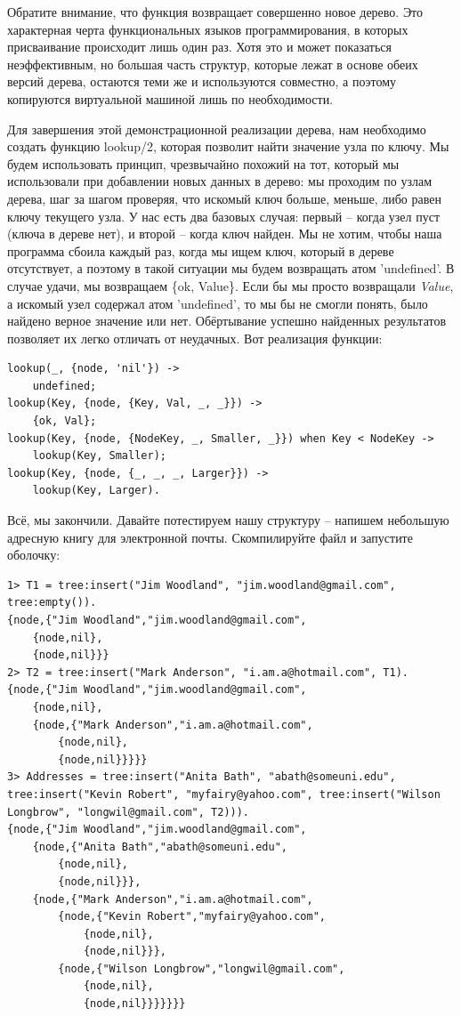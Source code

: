 \documentclass[a4paper,12pt]{report}
\newcommand{\ops}{\colorbox{lgreen}}
\begin{document}
Обратите внимание, что функция возвращает совершенно новое дерево. Это характерная черта функциональных языков программирования, в которых присваивание происходит лишь один раз. Хотя это и может показаться неэффективным, но большая часть структур, которые лежат в основе обеих версий дерева, остаются теми же и используются совместно, а поэтому копируются виртуальной машиной лишь по необходимости.

Для завершения этой демонстрационной реализации дерева, нам необходимо создать функцию \ops{lookup/2}, которая позволит найти значение узла по ключу. Мы будем использовать принцип, чрезвычайно похожий на тот, который мы использовали при добавлении новых данных в дерево: мы проходим по узлам дерева, шаг за шагом проверяя, что искомый ключ больше, меньше, либо равен ключу текущего узла. У нас есть два базовых случая: первый \--- когда узел пуст (ключа в дереве нет), и второй \--- когда ключ найден. Мы не хотим, чтобы наша программа сбоила каждый раз, когда мы ищем ключ, который в дереве отсутствует, а поэтому в такой ситуации мы будем возвращать атом 'undefined'. В случае удачи, мы возвращаем \ops{\{ok, Value\}}. Если бы мы просто возвращали \emph{Value}, а искомый узел содержал атом 'undefined', то мы бы не смогли понять, было найдено верное значение или нет. Обёртывание успешно найденных результатов позволяет их легко отличать от неудачных. Вот реализация функции:
\begin{lstlisting}[style=erlang]
lookup(_, {node, 'nil'}) ->
    undefined;
lookup(Key, {node, {Key, Val, _, _}}) ->
    {ok, Val};
lookup(Key, {node, {NodeKey, _, Smaller, _}}) when Key < NodeKey ->
    lookup(Key, Smaller);
lookup(Key, {node, {_, _, _, Larger}}) ->
    lookup(Key, Larger).
\end{lstlisting}

Всё, мы закончили. Давайте потестируем нашу структуру \--- напишем небольшую адресную книгу для электронной почты. Скомпилируйте файл и запустите оболочку:
\begin{lstlisting}[style=erlang]
1> T1 = tree:insert("Jim Woodland", "jim.woodland@gmail.com", tree:empty()).
{node,{"Jim Woodland","jim.woodland@gmail.com",
    {node,nil},
    {node,nil}}}
2> T2 = tree:insert("Mark Anderson", "i.am.a@hotmail.com", T1).
{node,{"Jim Woodland","jim.woodland@gmail.com",
    {node,nil},
    {node,{"Mark Anderson","i.am.a@hotmail.com",
        {node,nil},
        {node,nil}}}}}
3> Addresses = tree:insert("Anita Bath", "abath@someuni.edu", tree:insert("Kevin Robert", "myfairy@yahoo.com", tree:insert("Wilson Longbrow", "longwil@gmail.com", T2))).
{node,{"Jim Woodland","jim.woodland@gmail.com",
    {node,{"Anita Bath","abath@someuni.edu",
        {node,nil},
        {node,nil}}},
    {node,{"Mark Anderson","i.am.a@hotmail.com",
        {node,{"Kevin Robert","myfairy@yahoo.com",
            {node,nil},
            {node,nil}}},
        {node,{"Wilson Longbrow","longwil@gmail.com",
            {node,nil},
            {node,nil}}}}}}}
\end{lstlisting}
\end{document}
